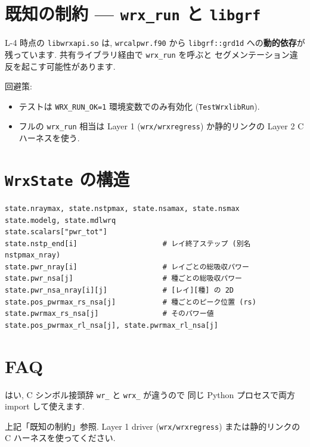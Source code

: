 \documentclass[11pt,a4paper]{report}
\begin{document}
\section{既知の制約 --- \texttt{wrx\_run} と \texttt{libgrf}}

\begin{warn}
L-4 時点の \texttt{libwrxapi.so} は, \texttt{wrcalpwr.f90} から
\texttt{libgrf::grd1d} への\textbf{動的依存}が残っています.
共有ライブラリ経由で \texttt{wrx\_run} を呼ぶと
セグメンテーション違反を起こす可能性があります.

回避策:
\begin{itemize}
  \item テストは \texttt{WRX\_RUN\_OK=1} 環境変数でのみ有効化
        (\texttt{TestWrxlibRun}).
  \item フルの \texttt{wrx\_run} 相当は Layer 1 (\texttt{wrx/wrxregress})
        か静的リンクの Layer 2 C ハーネスを使う.
\end{itemize}
\end{warn}

\section{\texttt{WrxState} の構造}

\begin{lstlisting}[style=py]
state.nraymax, state.nstpmax, state.nsamax, state.nsmax
state.modelg, state.mdlwrq
state.scalars["pwr_tot"]
state.nstp_end[i]                    # レイ終了ステップ (別名 nstpmax_nray)
state.pwr_nray[i]                    # レイごとの総吸収パワー
state.pwr_nsa[j]                     # 種ごとの総吸収パワー
state.pwr_nsa_nray[i][j]             # [レイ][種] の 2D
state.pos_pwrmax_rs_nsa[j]           # 種ごとのピーク位置 (rs)
state.pwrmax_rs_nsa[j]               # そのパワー値
state.pos_pwrmax_rl_nsa[j], state.pwrmax_rl_nsa[j]
\end{lstlisting}

\section{FAQ}

\begin{faq}
はい, C シンボル接頭辞 \texttt{wr\_} と \texttt{wrx\_} が違うので
同じ Python プロセスで両方 import して使えます.
\end{faq}

\begin{faq}
上記「既知の制約」参照. Layer 1 driver (\texttt{wrx/wrxregress})
または静的リンクの C ハーネスを使ってください.
\end{faq}
\end{document}
